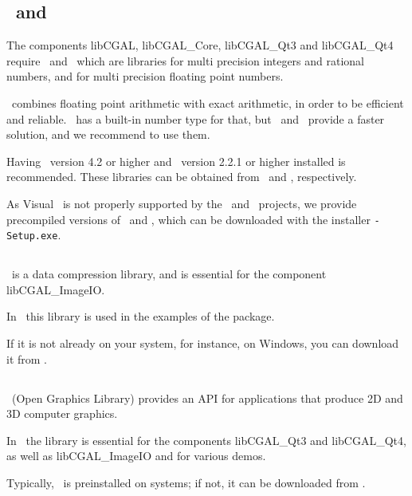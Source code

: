 \subsection{\gmp\ and \mpfr\ \label{thirdparty:GMP} \label{thirdparty:MPFR}}

The components libCGAL, libCGAL\_Core, libCGAL\_Qt3 and libCGAL\_Qt4 require 
\gmp\ and \mpfr\ which are libraries for multi precision integers and rational numbers,
and for multi precision floating point numbers.

\cgal\ combines floating point arithmetic with exact arithmetic,
in order to be efficient and reliable. \cgal\ has a built-in 
number type for that, but \gmp\ and \mpfr\ provide a faster
solution, and we recommend to use them.

Having \gmp\ version 4.2 or higher and \mpfr\ version 2.2.1 or higher
installed is recommended. These libraries can be obtained from
\gmppage\ and \mpfrpage, respectively. 

As Visual \CC\ is not properly
supported by the \gmp\ and \mpfr\ projects, we provide precompiled versions
of \gmp\ and \mpfr, which can be downloaded with the installer
\texttt{\cgalrel-Setup.exe}.

\subsection{\zlib \label{thirdparty:zlib}}

\zlib\ is a data compression library, and is essential for the component libCGAL\_ImageIO.

In \cgal\ this library is used in the examples of the  package.

If it is not already on your system,
for instance, on Windows, you can download it from  \zlibpage.

\subsection{\opengl \label{thirdparty:OpenGL}}

\opengl\ (Open Graphics Library) provides an API for applications that
produce 2D and 3D computer graphics.

In \cgal\ the library is essential for the components libCGAL\_Qt3 and
libCGAL\_Qt4, as well as libCGAL\_ImageIO and for various demos.

Typically, \opengl\ is preinstalled on systems; if not, it can be
downloaded from \openglpage.

